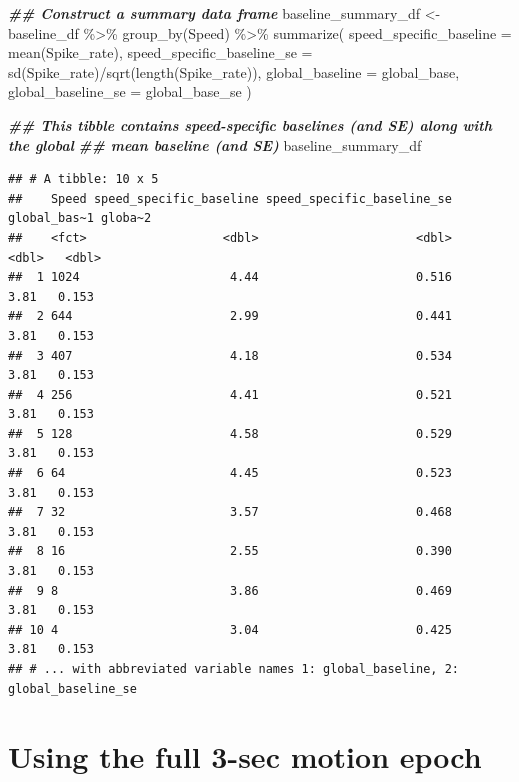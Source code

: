 \documentclass[
]{book}
\newenvironment{Shaded}{\begin{snugshade}}{\end{snugshade}}
\newcommand{\AttributeTok}[1]{\textcolor[rgb]{0.77,0.63,0.00}{#1}}
\newcommand{\DocumentationTok}[1]{\textcolor[rgb]{0.56,0.35,0.01}{\textbf{\textit{#1}}}}
\newcommand{\FunctionTok}[1]{\textcolor[rgb]{0.00,0.00,0.00}{#1}}
\newcommand{\NormalTok}[1]{#1}
\newcommand{\OtherTok}[1]{\textcolor[rgb]{0.56,0.35,0.01}{#1}}
\newcommand{\SpecialCharTok}[1]{\textcolor[rgb]{0.00,0.00,0.00}{#1}}
\begin{document}
\begin{Shaded}
\begin{Highlighting}[]
\DocumentationTok{\#\# Construct a summary data frame}
\NormalTok{baseline\_summary\_df }\OtherTok{\textless{}{-}}
\NormalTok{  baseline\_df }\SpecialCharTok{\%\textgreater{}\%}
  \FunctionTok{group\_by}\NormalTok{(Speed) }\SpecialCharTok{\%\textgreater{}\%}
  \FunctionTok{summarize}\NormalTok{(}
    \AttributeTok{speed\_specific\_baseline =} \FunctionTok{mean}\NormalTok{(Spike\_rate),}
    \AttributeTok{speed\_specific\_baseline\_se =} \FunctionTok{sd}\NormalTok{(Spike\_rate)}\SpecialCharTok{/}\FunctionTok{sqrt}\NormalTok{(}\FunctionTok{length}\NormalTok{(Spike\_rate)),}
    \AttributeTok{global\_baseline =}\NormalTok{ global\_base,}
    \AttributeTok{global\_baseline\_se =}\NormalTok{ global\_base\_se}
\NormalTok{  )}

\DocumentationTok{\#\# This tibble contains speed{-}specific baselines (and SE) along with the global}
\DocumentationTok{\#\# mean baseline (and SE)}
\NormalTok{baseline\_summary\_df}
\end{Highlighting}
\end{Shaded}

\begin{verbatim}
## # A tibble: 10 x 5
##    Speed speed_specific_baseline speed_specific_baseline_se global_bas~1 globa~2
##    <fct>                   <dbl>                      <dbl>        <dbl>   <dbl>
##  1 1024                     4.44                      0.516         3.81   0.153
##  2 644                      2.99                      0.441         3.81   0.153
##  3 407                      4.18                      0.534         3.81   0.153
##  4 256                      4.41                      0.521         3.81   0.153
##  5 128                      4.58                      0.529         3.81   0.153
##  6 64                       4.45                      0.523         3.81   0.153
##  7 32                       3.57                      0.468         3.81   0.153
##  8 16                       2.55                      0.390         3.81   0.153
##  9 8                        3.86                      0.469         3.81   0.153
## 10 4                        3.04                      0.425         3.81   0.153
## # ... with abbreviated variable names 1: global_baseline, 2: global_baseline_se
\end{verbatim}

\hypertarget{using-the-full-3-sec-motion-epoch}{%
\section{Using the full 3-sec motion epoch}\label{using-the-full-3-sec-motion-epoch}}
\end{document}

